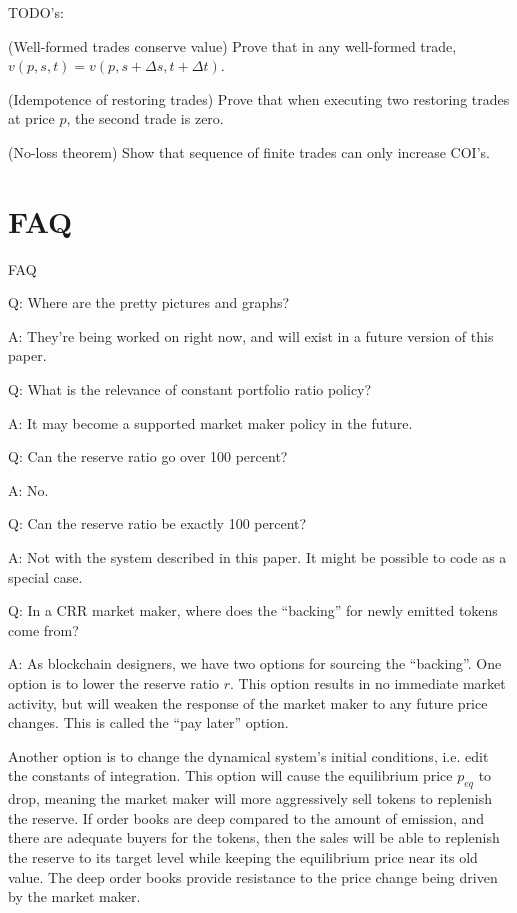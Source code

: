 \documentclass{article}
\begin{document}
TODO's:

(Well-formed trades conserve value)  Prove that in any well-formed trade, $v(p, s, t) = v(p, s + \Delta s, t + \Delta t)$.

(Idempotence of restoring trades)  Prove that when executing two restoring trades at price $p$, the second trade is zero.

(No-loss theorem)  Show that sequence of finite trades can only increase COI's.

\section{FAQ}

FAQ

Q:  Where are the pretty pictures and graphs?

A:  They're being worked on right now, and will exist in a future version of this paper.

Q:  What is the relevance of constant portfolio ratio policy?

A:  It may become a supported market maker policy in the future.

Q:  Can the reserve ratio go over 100 percent?

A:  No.

Q:  Can the reserve ratio be exactly 100 percent?

A:  Not with the system described in this paper.  It might be possible to code as a special case.

Q:  In a CRR market maker, where does the ``backing'' for newly emitted tokens come from?

A:  As blockchain designers, we have two options for sourcing the ``backing''.  One option
is to lower the reserve ratio $r$.  This option results in no immediate market
activity, but will weaken the response of the market maker to any future price changes.
This is called the ``pay later'' option.

Another option is to change the dynamical system's initial conditions, i.e. edit the
constants of integration.  This option will cause the equilibrium price $p_{eq}$ to drop,
meaning the market maker will more aggressively sell tokens to replenish the reserve.
If order books are deep compared to the amount of emission, and there are adequate buyers
for the tokens, then the sales will be able to replenish the reserve to its target level while
keeping the equilibrium price near its old value.  The deep order books provide resistance to
the price change being driven by the market maker.
\end{document}
